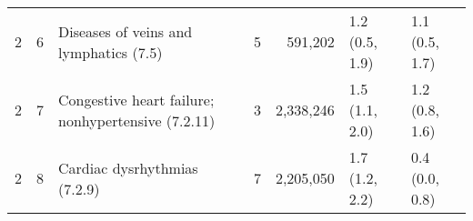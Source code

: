 \begin{tabular}{llp{6.5cm}rrp{2.2cm}p{2.2cm}}
   2 &  6 & Diseases of veins and lymphatics (7.5) &  5 & 591,202 & 1.2 (0.5, 1.9) & 1.1 (0.5, 1.7) \\ 
   2 &  7 & Congestive heart failure; nonhypertensive (7.2.11) &  3 & 2,338,246 & 1.5 (1.1, 2.0) & 1.2 (0.8, 1.6) \\ 
   2 &  8 & Cardiac dysrhythmias (7.2.9) &  7 & 2,205,050 & 1.7 (1.2, 2.2) & 0.4 (0.0, 0.8) \\ 
   \hline
\end{tabular}

